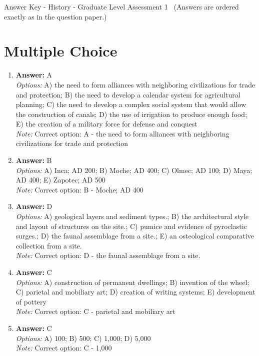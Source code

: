 \documentclass[12pt]{article}
\begin{document}
\begin{center}
Answer Key - History - Graduate Level Assessment 1 \
\small (Answers are ordered exactly as in the question paper.)
\end{center}

\section*{Multiple Choice}
\begin{enumerate}[label=\arabic*.]
\item \textbf{Answer:} A
\\ \textit{Options:} A) the need to form alliances with neighboring civilizations for trade and protection; B) the need to develop a calendar system for agricultural planning; C) the need to develop a complex social system that would allow the construction of canals; D) the use of irrigation to produce enough food; E) the creation of a military force for defense and conquest
\\ \textit{Note:} Correct option: A - the need to form alliances with neighboring civilizations for trade and protection
\item \textbf{Answer:} B
\\ \textit{Options:} A) Inca; AD 200; B) Moche; AD 400; C) Olmec; AD 100; D) Maya; AD 400; E) Zapotec; AD 500
\\ \textit{Note:} Correct option: B - Moche; AD 400
\item \textbf{Answer:} D
\\ \textit{Options:} A) geological layers and sediment types.; B) the architectural style and layout of structures on the site.; C) pumice and evidence of pyroclastic surges.; D) the faunal assemblage from a site.; E) an osteological comparative collection from a site.
\\ \textit{Note:} Correct option: D - the faunal assemblage from a site.
\item \textbf{Answer:} C
\\ \textit{Options:} A) construction of permanent dwellings; B) invention of the wheel; C) parietal and mobiliary art; D) creation of writing systems; E) development of pottery
\\ \textit{Note:} Correct option: C - parietal and mobiliary art
\item \textbf{Answer:} C
\\ \textit{Options:} A) 100; B) 500; C) 1,000; D) 5,000
\\ \textit{Note:} Correct option: C - 1,000
\end{enumerate}
\end{document}

